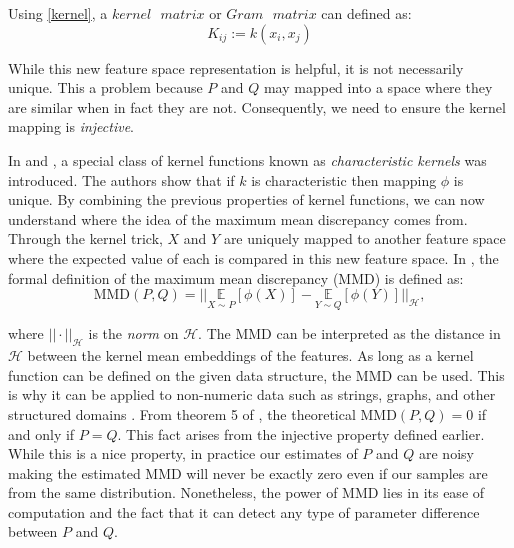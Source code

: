 Using \ref{kernel}, a $kernel\text{ }matrix$ or $Gram\text{ }matrix$ can defined as:
\begin{equation}
K_{ij} := k(x_i, x_j)
\end{equation}


While this new feature space representation is helpful, it is not necessarily unique. This a problem because $P$ and $Q$ may mapped into a space where they are similar when in fact they are not. Consequently, we need to ensure the kernel mapping is \textit{injective}. 

In \cite{fukumizu2008kernel} and , a special class of kernel functions known as \textit{characteristic kernels} was introduced. The authors show that if $k$ is characteristic then mapping $\phi$ is unique. By combining the previous properties of kernel functions, we can now understand where the idea of the maximum mean discrepancy comes from. Through the kernel trick, $X$ and $Y$ are uniquely mapped to another feature space where the expected value of each is compared in this new feature space. In \cite{smola2007hilbert}, the formal definition of the maximum mean discrepancy (MMD) is defined as:
\begin{equation}
\label{mmd_theory}
\text{MMD}(P,Q)=|| \underset{X \sim P}{\mathbb{E}}[\phi(X)] -  \underset{Y \sim Q}{\mathbb{E}}[\phi(Y)]||_\mathcal{H},
\end{equation}

where $||\cdot||_\mathcal{H}$ is the \textit{norm} on $\mathcal{H}$. The MMD can be interpreted as the distance in $\mathcal{H}$ between the kernel mean embeddings of the features. As long as a kernel function can be defined on the given data structure, the MMD can be used. This is why it can be applied to non-numeric data such as strings, graphs, and other structured domains \cite{hofmann2008kernel}. From theorem 5 of \cite{gretton2012kernel}, the theoretical MMD$(P,Q) = 0$ if and only if $P=Q$. This fact arises from the injective property defined earlier. While this is a nice property, in practice our estimates of $P$ and $Q$ are noisy making the estimated MMD will never be exactly zero even if our samples are from the same distribution. Nonetheless, the power of MMD lies in its ease of computation and the fact that it can detect any type of parameter difference between $P$ and $Q$. 


